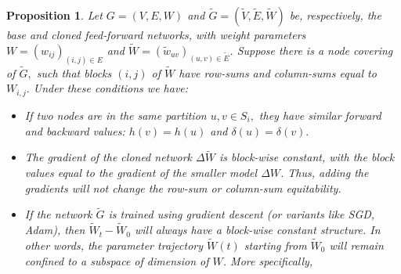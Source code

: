 \documentclass{article}
\newcommand{\ff}[1]{\todo[color=blue!30,size=\tiny]{FF: #1}}
\newtheorem{proposition}{Proposition}[section]
\begin{document}
\begin{proposition}
\label{prop:cloned}
    Let $G=(V,E,W)$ and $\widetilde{G}=(\widetilde{V},\widetilde{E},\widetilde{W})$
be, respectively, the \emph{base} and \emph{cloned} feed‑forward networks, with
weight parameters \(W=(w_{ij})_{(i,j)\in E}\) and
\(\widetilde{W}=(\widetilde w_{uv})_{(u,v)\in \widetilde E}\). Suppose there is a node covering of $\widetilde{G},$ such that blocks $(i,j)$ of $\widetilde{W}$ have row-sums and column-sums equal to $W_{i,j}.$ Under these conditions we have:
\begin{itemize}
    \item If two nodes are in the same partition $u,v \in S_i,$ they have similar forward and backward values: $h(v) = h(u)$ and $\delta(u)=\delta(v).$
    \item The gradient of the cloned network $\Delta\widetilde{W}$ is block-wise constant, with the block values equal to the gradient of the smaller model $\Delta W$. Thus, adding the gradients will not change the row-sum or column-sum equitability.
    \item If the network $\widetilde{G}$ is trained using gradient descent (or variants like SGD, Adam), then $\widetilde{W}_t - \widetilde{W}_0$ will always have a block-wise constant structure. In other words, the parameter trajectory $\widetilde{W}(t)$ starting from $\widetilde{W}_0$ will remain confined to a subspace of dimension of $W$. More specifically,\ff{incomplete}
\end{itemize}
\end{proposition}
\end{document}
